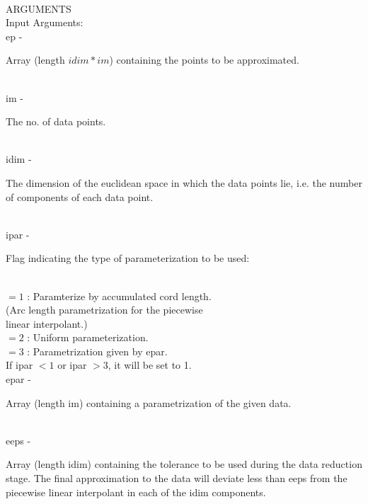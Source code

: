 \\
ARGUMENTS\\
	\>Input Arguments:\\
        \>\>    {\fov ep}\> - \>  \begin{minipg2}
                     Array (length $idim*im$) containing the points to
                 be approximated.
                               \end{minipg2}\\[0.8ex]
        \>\>    {\fov im}\> - \>  \begin{minipg2}
                     The no. of data points.
                               \end{minipg2}\\
        \>\>    {\fov idim}\> - \>  \begin{minipg2}
                     The dimension of the euclidean space in which the data
                 points lie, i.e. the number of components of each data point.
                               \end{minipg2}\\
        \>\>    {\fov ipar}\> - \> \begin{minipg2}
                     Flag indicating the type of parameterization to be used:
                               \end{minipg2}\\[0.8ex]
                \>\>\>\>   $= 1$ : Paramterize by accumulated cord length.\\
                \>\>\>\>         (Arc length parametrization for the piecewise\\
                \>\>\>\>         linear interpolant.)\\
                \>\>\>\>   $= 2$ : Uniform parameterization.\\
                \>\>\>\>   $= 3$ : Parametrization given by epar.\\
                \>\>\>\>  If ipar $<1$  or ipar $>3$, it will be set to 1.\\
        \>\>    {\fov epar}\> - \>  \begin{minipg2}
                     Array (length im) containing a parametrization
                 of the given data.
                               \end{minipg2}\\
        \>\>    {\fov eeps}\> - \>  \begin{minipg2}
                     Array (length idim) containing the tolerance to be
                 used during the data reduction stage. The final
                 approximation to the data will deviate less than eeps
                 from the piecewise linear interpolant in each of the
                 idim components.
                               \end{minipg2}\\[0.8ex]
